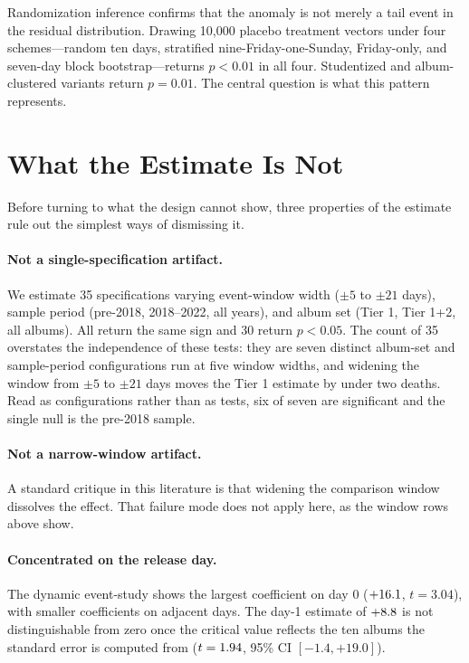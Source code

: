 \documentclass[11pt]{article}
\begin{document}


Randomization inference confirms that the anomaly is not merely a tail event in the residual distribution. Drawing 10{,}000 placebo treatment vectors under four schemes---random ten days, stratified nine-Friday-one-Sunday, Friday-only, and seven-day block bootstrap---returns $p < 0.01$ in all four. Studentized and album-clustered variants return $p = 0.01$. The central question is what this pattern represents.

\section{What the Estimate Is Not}
\label{sec:supporting}

Before turning to what the design cannot show, three properties of the estimate rule out the
simplest ways of dismissing it.

\paragraph{Not a single-specification artifact.}
We estimate 35 specifications varying event-window width ($\pm 5$ to $\pm 21$ days), sample period
(pre-2018, 2018--2022, all years), and album set (Tier 1, Tier 1+2, all \numNAllAlbums{} albums).
All return the same sign and 30 return $p < 0.05$. The count of 35 overstates the independence of
these tests: they are seven distinct album-set and sample-period configurations run at five window
widths, and widening the window from $\pm 5$ to $\pm 21$ days moves the Tier 1 estimate by under
two deaths. Read as configurations rather than as tests, six of seven are significant and the
single null is the pre-2018 sample.



\paragraph{Not a narrow-window artifact.}
A standard critique in this literature is that widening the comparison window dissolves the effect.
That failure mode does not apply here, as the window rows above show.

\paragraph{Concentrated on the release day.}
The dynamic event-study shows the largest coefficient on day 0 ($+16.1$,
$t = 3.04$), with smaller coefficients on adjacent days. The day-1 estimate of
$+8.8$ is not distinguishable from zero once the critical value reflects the ten
albums the standard error is computed from ($t = 1.94$, 95\% CI $[-1.4, +19.0]$).
\end{document}
